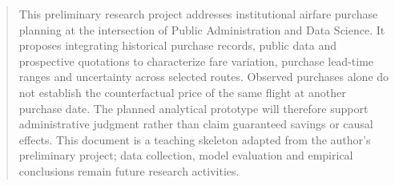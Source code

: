 \begin{abstract}
This preliminary research project addresses institutional airfare purchase planning at the intersection of Public Administration and Data Science. It proposes integrating historical purchase records, public data and prospective quotations to characterize fare variation, purchase lead-time ranges and uncertainty across selected routes. Observed purchases alone do not establish the counterfactual price of the same flight at another purchase date. The planned analytical prototype will therefore support administrative judgment rather than claim guaranteed savings or causal effects. This document is a teaching skeleton adapted from the author's preliminary project; data collection, model evaluation and empirical conclusions remain future research activities.
\end{abstract}
